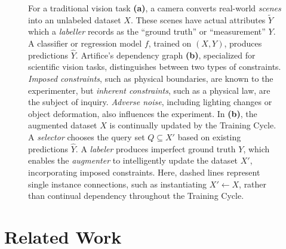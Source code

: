\documentclass[10pt, journal]{IEEEtran}
\begin{document}
\begin{figure}
  \centering
  \hspace{0.1\linewidth}

  \caption{For a traditional vision task \textbf{(a)}, a camera converts
    real-world \textit{scenes} into an unlabeled dataset $X$. These scenes have
    actual attributes $\tilde{Y}$ which a \textit{labeller} records as the
    ``ground truth'' or ``measurement'' $Y$. A classifier or regression model
    $f$, trained on $(X,Y)$, produces predictions $\hat{Y}$.
    Artifice's dependency graph \textbf{(b)}, specialized for scientific vision
    tasks, distinguishes between two types of constraints. \textit{Imposed
      constraints}, such as physical boundaries, are known to the experimenter,
    but \textit{inherent constraints}, such as a physical law, are the subject
    of inquiry. \textit{Adverse noise}, including lighting changes or object
    deformation, also influences the experiment. In \textbf{(b)}, the augmented
    dataset $X$ is continually updated by the Training Cycle. A
    \textit{selector} chooses the query set $Q \subseteq X'$ based on existing
    predictions $\hat{Y}$. A \textit{labeler} produces imperfect ground truth
    $Y$, which enables the \textit{augmenter} to intelligently update the
    dataset $X'$, incorporating imposed constraints. Here, dashed lines
    represent single instance connections, such as instantiating $X' \gets X$,
    rather than continual dependency throughout the Training Cycle.}
  \label{fig:dependency-graphs}
\end{figure}

\section{Related Work}
\label{sec:related-work}
\end{document}
